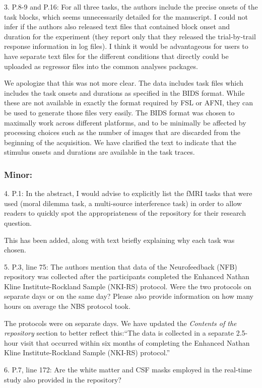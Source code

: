 \documentclass{article}
\newcommand{\RESPONSE}[1]{\textcolor{responseblue}{#1}}
\begin{document}
3. P.8-9 and P.16: For all three tasks, the authors include the precise onsets of the task blocks, which seems unnecessarily detailed for the manuscript. I could not infer if the authors also released text files that contained block onset and duration for the experiment (they report only that they released the trial-by-trail response information in log files). I think it would be advantageous for users to have separate text files for the different conditions that directly could be uploaded as regressor files into the common analyses packages.

\RESPONSE{We apologize that this was not more clear. The data includes task files which includes the task onsets and durations as specified in the BIDS format. While these are not available in exactly the format required by FSL or AFNI, they can be used to generate those files very easily. The BIDS format was chosen to maximally work across different platforms, and to be minimally be affected by processing choices such as the number of images that are discarded from the beginning of the acquisition. We have clarified the text to indicate that the stimulus onsets and durations are available in the task traces.}

\subsubsection*{Minor:}
4. P.1: In the abstract, I would advise to explicitly list the fMRI tasks that were used (moral dilemma task, a multi-source interference task) in order to allow readers to quickly spot the appropriateness of the repository for their research question.

\RESPONSE{This has been added, along with text briefly explaining why each task was chosen.}

5. P.3, line 75: The authors mention that data of the Neurofeedback (NFB) repository was collected after the participants completed the Enhanced Nathan Kline Institute-Rockland Sample (NKI-RS) protocol. Were the two protocols on separate days or on the same day? Please also provide information on how many hours on average the NBS protocol took.

\RESPONSE{The protocols were on separate days. We have updated the \emph{Contents of the repository} section to better reflect this:``The data is collected in a separate 2.5-hour visit that occurred within six months of completing the Enhanced Nathan Kline Institute-Rockland Sample (NKI-RS) protocol.''}

6. P.7, line 172: Are the white matter and CSF masks employed in the real-time study also provided in the repository?
\end{document}

